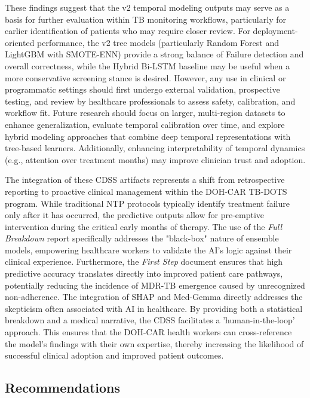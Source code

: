 \documentclass[12pt]{article}
\begin{document}
These findings suggest that the v2 temporal modeling outputs may serve as a basis for further evaluation within TB monitoring workflows, particularly for earlier identification of patients who may require closer review. For deployment-oriented performance, the v2 tree models (particularly Random Forest and LightGBM with SMOTE-ENN) provide a strong balance of Failure detection and overall correctness, while the Hybrid Bi-LSTM baseline may be useful when a more conservative screening stance is desired. However, any use in clinical or programmatic settings should first undergo external validation, prospective testing, and review by healthcare professionals to assess safety, calibration, and workflow fit. Future research should focus on larger, multi-region datasets to enhance generalization, evaluate temporal calibration over time, and explore hybrid modeling approaches that combine deep temporal representations with tree-based learners. Additionally, enhancing interpretability of temporal dynamics (e.g., attention over treatment months) may improve clinician trust and adoption.

The integration of these CDSS artifacts represents a shift from retrospective reporting to proactive clinical management within the DOH-CAR TB-DOTS program. While traditional NTP protocols typically identify treatment failure only after it has occurred, the predictive outputs allow for pre-emptive intervention during the critical early months of therapy. The use of the \textit{Full Breakdown} report specifically addresses the "black-box" nature of ensemble models, empowering healthcare workers to validate the AI's logic against their clinical experience. Furthermore, the \textit{First Step} document ensures that high predictive accuracy translates directly into improved patient care pathways, potentially reducing the incidence of MDR-TB emergence caused by unrecognized non-adherence. The integration of SHAP and Med-Gemma directly addresses the skepticism often associated with AI in healthcare. By providing both a statistical breakdown and a medical narrative, the CDSS facilitates a 'human-in-the-loop' approach. This ensures that the DOH-CAR health workers can cross-reference the model’s findings with their own expertise, thereby increasing the likelihood of successful clinical adoption and improved patient outcomes.

\subsection{Recommendations}
\end{document}
